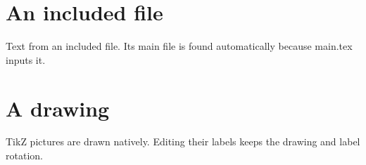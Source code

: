 \section{An included file}
Text from an included file. Its main file is found automatically because main.tex inputs it.

\newpage
\section{A drawing}
TikZ pictures are drawn natively. Editing their labels keeps the drawing and label rotation.

\begin{center}
\end{center}
